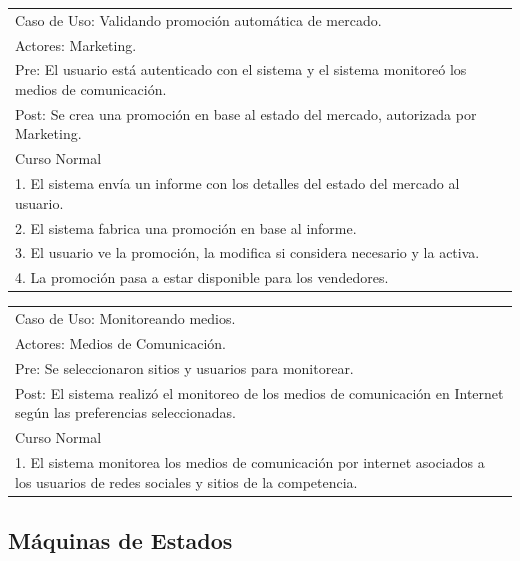 \vspace{1cm}

\begin{tabular}{ | p{14cm} | }
  \hline
  Caso de Uso: Validando promoción automática de mercado. \\
  Actores: Marketing. \\
  Pre: El usuario está autenticado con el sistema y el sistema monitoreó los medios de comunicación. \\
  Post: Se crea una promoción en base al estado del mercado, autorizada por Marketing. \\
  \hline
  Curso Normal\\
  \hline
  1. El sistema envía un informe con los detalles del estado del mercado al usuario. \\
  2. El sistema fabrica una promoción en base al informe. \\
  3. El usuario ve la promoción, la modifica si considera necesario y la activa. \\
  4. La promoción pasa a estar disponible para los vendedores. \\
  \hline
\end{tabular}

\vspace{1cm}

\begin{tabular}{ | p{14cm} | }
  \hline
  Caso de Uso: Monitoreando medios.\\
  Actores: Medios de Comunicación. \\
  Pre: Se seleccionaron sitios y usuarios para monitorear. \\
  Post: El sistema realizó el monitoreo de los medios de comunicación en Internet según las preferencias seleccionadas. \\
  \hline
  Curso Normal\\
  \hline
  1. El sistema monitorea los medios de comunicación por internet asociados a los usuarios de redes sociales y sitios de la competencia. \\
  \hline
\end{tabular}

\subsection{Máquinas de Estados}

